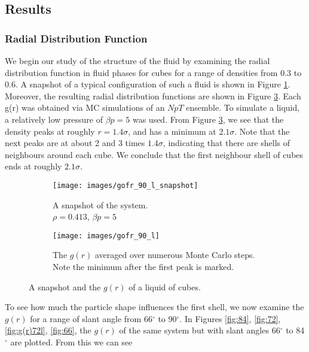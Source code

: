 \documentclass[thesis]{subfiles}
\begin{document}
\subsection{Results}

\subsubsection{Radial Distribution Function}

We begin our study of the structure of the fluid by examining the radial distribution function in fluid phases for cubes  for a range of densities from 0.3 to 0.6. A snapshot of a typical configuration of such a fluid is shown in Figure \ref{fig:g(r)90lsnap}. Moreover, the resulting radial distribution functions are shown in Figure \ref{fig:g(r)90l}.  Each g(r) was obtained via MC simulations of an $NpT$ ensemble. To simulate a liquid, a relatively low pressure of $\beta p = 5$ was used. From Figure \ref{fig:g(r)90l}, we see that the density peaks at roughly $r = 1.4\sigma$, and has a minimum at $2.1\sigma$. Note that the next peaks are at about 2 and 3 times $1.4\sigma$, indicating that there are shells of neighbours around each cube. We conclude that the first neighbour shell of cubes ends at roughly $2.1\sigma$. 

\begin{figure}[H]
	\centering
	\vspace{-8pt}
	\begin{subfigure}{0.3\textwidth}
		\centering
		\vspace{8pt}
		\texttt{[image: images/gofr\_90\_l\_snapshot]}
		\vspace{10pt}
		\caption{A snapshot of the system.\\$\rho = 0.413$, $\beta p = 5$}  \label{fig:g(r)90lsnap}
	\end{subfigure}
	\begin{subfigure}{0.5\textwidth}
		\centering
		\texttt{[image: images/gofr\_90\_l]}
		\caption{The $g(r)$ averaged over numerous Monte Carlo steps. Note the minimum after the first peak is marked.} \label{fig:g(r)90l}
	\end{subfigure}
	\caption{A snapshot and the $g(r)$ of a liquid of cubes.}
\end{figure}

To see how much the particle shape influences the first shell, we now examine the $g(r)$ for a range of slant angle from 66$^\circ$ to 90$^\circ$.  In Figures \ref{fig:84}, \ref{fig:72}, \ref{fig:g(r)72l}, \ref{fig:66}, the $g(r)$ of the same system but with slant angles 66$^\circ$ to 84$^\circ$ are plotted. From this we can see 
\end{document}
